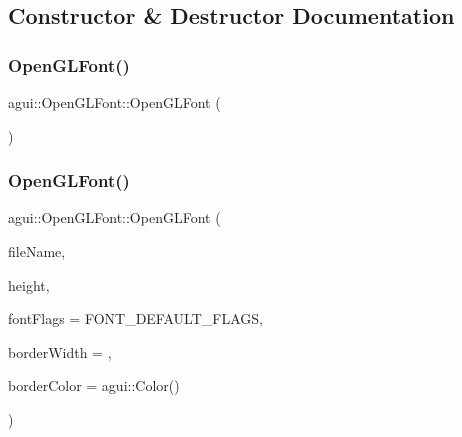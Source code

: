 \subsection{Constructor \& Destructor Documentation}
\mbox{\label{classagui_1_1_open_g_l_font_a0b754bbe97e143399be1921c82e614ad}} 
\subsubsection{\texorpdfstring{Open\+G\+L\+Font()}{OpenGLFont()}\hspace{0.1cm}{\footnotesize\ttfamily [1/2]}}
{\footnotesize\ttfamily agui\+::\+Open\+G\+L\+Font\+::\+Open\+G\+L\+Font (\begin{DoxyParamCaption}{ }\end{DoxyParamCaption})\hspace{0.3cm}{\ttfamily [explicit]}}

\mbox{\label{classagui_1_1_open_g_l_font_acab7213d398235345e1b080a70342d70}} 
\subsubsection{\texorpdfstring{Open\+G\+L\+Font()}{OpenGLFont()}\hspace{0.1cm}{\footnotesize\ttfamily [2/2]}}
{\footnotesize\ttfamily agui\+::\+Open\+G\+L\+Font\+::\+Open\+G\+L\+Font (\begin{DoxyParamCaption}\item[{const std\+::string \&}]{file\+Name,  }\item[{int}]{height,  }\item[{Font\+Flags}]{font\+Flags = {\ttfamily FONT\+\_\+DEFAULT\+\_\+FLAGS},  }\item[{float}]{border\+Width = {},  }\item[{agui\+::\+Color}]{border\+Color = {\ttfamily agui\+:\+:Color()} }\end{DoxyParamCaption})\hspace{0.3cm}{\ttfamily [explicit]}}

